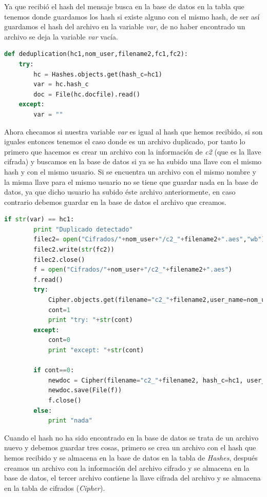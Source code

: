 Ya que recibió el hash del mensaje busca en la base de datos en la tabla que tenemos donde guardamos los hash si existe alguno con el mismo hash, de ser así guardamos el hash del archivo en la variable \textit{var}, de no haber encontrado un archivo se deja la variable \textit{var} vacía.

\begin{lstlisting}[language=Python,frame=single, keywordstyle=\color{blue},breaklines=true, showstringspaces=false]
    def deduplication(hc1,nom_user,filename2,fc1,fc2):
    try:
        hc = Hashes.objects.get(hash_c=hc1)
        var = hc.hash_c
        doc = File(hc.docfile).read()
    except:
        var = ""
\end{lstlisting}

Ahora checamos si nuestra variable \textit{var} es igual al hash que hemos recibido, si son iguales entonces tenemos el caso donde es un archivo duplicado, por tanto lo primero que hacemos es crear un archivo con la información de \textit{c2} (que es la llave cifrada) y buscamos en la base de datos si ya se ha subido una llave con el mismo hash y  con el mismo usuario. Si se encuentra un archivo con el mismo nombre y la misma llave para el mismo usuario no se tiene que guardar nada en la base de datos, ya que dicho usuario ha subido éste archivo anteriormente, en caso contrario debemos guardar en la base de datos el archivo que creamos.

\begin{lstlisting}[language=Python,frame=single, keywordstyle=\color{blue},breaklines=true, showstringspaces=false]
 if str(var) == hc1:
        print "Duplicado detectado"
        filec2= open("Cifrados/"+nom_user+"/c2_"+filename2+".aes","wb")
        filec2.write(str(fc2))
        filec2.close()
        f = open("Cifrados/"+nom_user+"/c2_"+filename2+".aes")
        f.read()
        try:
            Cipher.objects.get(filename="c2_"+filename2,user_name=nom_user)
            cont=1
            print "try: "+str(cont)
        except:
            cont=0
            print "except: "+str(cont)

        if cont==0:
            newdoc = Cipher(filename="c2_"+filename2, hash_c=hc1, user_name=nom_user, docfile=File(f))
            newdoc.save(File(f))
            f.close()
        else:
            print "nada"
\end{lstlisting}

Cuando el hash no ha sido encontrado en la base de datos se trata de un archivo nuevo y debemos guardar tres cosas, primero se crea un archivo con el hash que hemos recibido y se almacena en la base de datos en la tabla de \textit{Hashes}, después creamos un archivo con la información del archivo cifrado y se almacena en la base de datos, el tercer archivo contiene la llave cifrada del archivo y se almacena en la tabla de cifrados (\textit{Cipher}).

